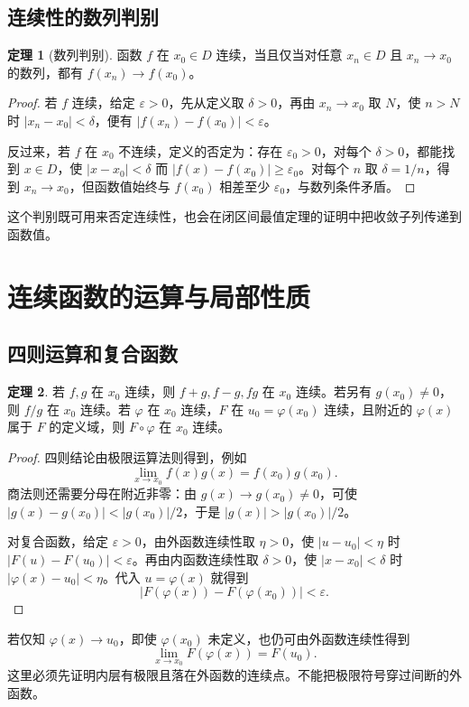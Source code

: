 \documentclass[UTF8,fontset=fandol,12pt,oneside,openany]{ctexrep}
\theoremstyle{definition}
\newtheorem{theorem}{定理}[chapter]
\begin{document}
\subsection{连续性的数列判别}
\begin{theorem}[数列判别]
函数 $f$ 在 $x_0\in D$ 连续，当且仅当对任意 $x_n\in D$ 且 $x_n\to x_0$ 的数列，都有 $f(x_n)\to f(x_0)$。
\end{theorem}
\begin{proof}
若 $f$ 连续，给定 $\varepsilon>0$，先从定义取 $\delta>0$，再由 $x_n\to x_0$ 取 $N$，使 $n>N$ 时 $|x_n-x_0|<\delta$，便有 $|f(x_n)-f(x_0)|<\varepsilon$。

反过来，若 $f$ 在 $x_0$ 不连续，定义的否定为：存在 $\varepsilon_0>0$，对每个 $\delta>0$，都能找到 $x\in D$，使 $|x-x_0|<\delta$ 而 $|f(x)-f(x_0)|\ge\varepsilon_0$。对每个 $n$ 取 $\delta=1/n$，得到 $x_n\to x_0$，但函数值始终与 $f(x_0)$ 相差至少 $\varepsilon_0$，与数列条件矛盾。
\end{proof}
这个判别既可用来否定连续性，也会在闭区间最值定理的证明中把收敛子列传递到函数值。

\section{连续函数的运算与局部性质}
\label{lec:04:operations}

\subsection{四则运算和复合函数}
\begin{theorem}
若 $f,g$ 在 $x_0$ 连续，则 $f+g,f-g,fg$ 在 $x_0$ 连续。若另有 $g(x_0)\ne0$，则 $f/g$ 在 $x_0$ 连续。若 $\varphi$ 在 $x_0$ 连续，$F$ 在 $u_0=\varphi(x_0)$ 连续，且附近的 $\varphi(x)$ 属于 $F$ 的定义域，则 $F\circ\varphi$ 在 $x_0$ 连续。
\end{theorem}
\begin{proof}
四则结论由极限运算法则得到，例如
\[
 \lim_{x\to x_0}f(x)g(x)=f(x_0)g(x_0).
\]
商法则还需要分母在附近非零：由 $g(x)\to g(x_0)\ne0$，可使 $|g(x)-g(x_0)|<|g(x_0)|/2$，于是 $|g(x)|>|g(x_0)|/2$。

对复合函数，给定 $\varepsilon>0$，由外函数连续性取 $\eta>0$，使 $|u-u_0|<\eta$ 时 $|F(u)-F(u_0)|<\varepsilon$。再由内函数连续性取 $\delta>0$，使 $|x-x_0|<\delta$ 时 $|\varphi(x)-u_0|<\eta$。代入 $u=\varphi(x)$ 就得到
\[
 |F(\varphi(x))-F(\varphi(x_0))|<\varepsilon.
\]
\end{proof}

若仅知 $\varphi(x)\to u_0$，即使 $\varphi(x_0)$ 未定义，也仍可由外函数连续性得到
\[
 \lim_{x\to x_0}F(\varphi(x))=F(u_0).
\]
这里必须先证明内层有极限且落在外函数的连续点。不能把极限符号穿过间断的外函数。
\end{document}

